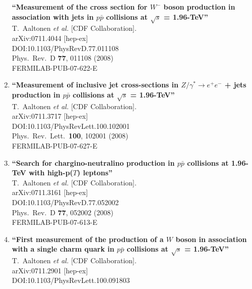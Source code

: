 \documentclass{article}
\begin{document}
\begin{enumerate}
{\bf ``Measurement of the cross section for $W^-$ boson production in association with jets in $p\bar{p}$ collisions at $\sqrt{s}$ = 1.96-TeV''}
  \\{}T.~Aaltonen {\it et al.} [CDF Collaboration].
  \\{}arXiv:0711.4044 [hep-ex]
  \\{}DOI:10.1103/PhysRevD.77.011108
  \\{}Phys.\ Rev.\ D {\bf 77}, 011108 (2008)
  \\{}FERMILAB-PUB-07-622-E
\item%
{\bf ``Measurement of inclusive jet cross-sections in $Z/\gamma^* \to e^{+} e^{-}$ + jets production in $p \bar{p}$ collisions at $\sqrt{s}$ = 1.96-TeV''}
  \\{}T.~Aaltonen {\it et al.} [CDF Collaboration].
  \\{}arXiv:0711.3717 [hep-ex]
  \\{}DOI:10.1103/PhysRevLett.100.102001
  \\{}Phys.\ Rev.\ Lett.\  {\bf 100}, 102001 (2008)
  \\{}FERMILAB-PUB-07-627-E
\item%
{\bf ``Search for chargino-neutralino production in $p \bar{p}$ collisions at 1.96-TeV with high-p($T$) leptons''}
  \\{}T.~Aaltonen {\it et al.} [CDF Collaboration].
  \\{}arXiv:0711.3161 [hep-ex]
  \\{}DOI:10.1103/PhysRevD.77.052002
  \\{}Phys.\ Rev.\ D {\bf 77}, 052002 (2008)
  \\{}FERMILAB-PUB-07-613-E
\item%
{\bf ``First measurement of the production of a $W$ boson in association with a single charm quark in $p \bar{p}$ collisions at $\sqrt{s}$ = 1.96-TeV''}
  \\{}T.~Aaltonen {\it et al.} [CDF Collaboration].
  \\{}arXiv:0711.2901 [hep-ex]
  \\{}DOI:10.1103/PhysRevLett.100.091803

\end{enumerate}
\end{document}
